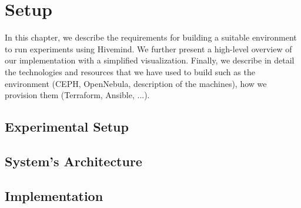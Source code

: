 \chapter{Setup}\label{chapter:setup}

In this chapter, we describe the requirements for building a suitable environment to run experiments using Hivemind. We further
present a high-level overview of our implementation with a simplified visualization. Finally, we describe in detail the technologies
and resources that we have used to build such as the environment (CEPH, OpenNebula, description of the machines), how we
provision them (Terraform, Ansible, ...).

\section{Experimental Setup}

\section{System's Architecture}


\section{Implementation}
